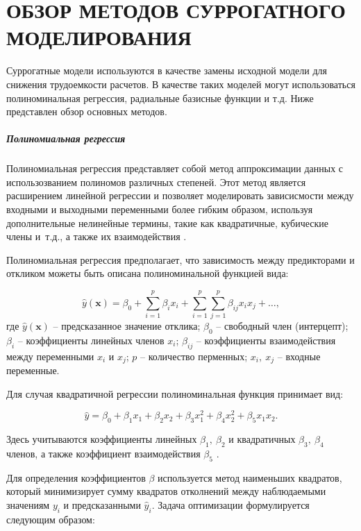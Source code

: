\chapter{ОБЗОР МЕТОДОВ СУРРОГАТНОГО МОДЕЛИРОВАНИЯ}\label{chap:surrogate-modeling}

Суррогатные модели используются в качестве замены исходной модели для снижения трудоемкости
расчетов. В качестве таких моделей могут использоваться полиноминальная регрессия, радиальные
базисные функции и т.д. Ниже представлен обзор основных методов.

\paragraph{Полиномиальная регрессия}

Полиномиальная регрессия представляет собой метод аппроксимации данных
с использозванием полиномов различных степеней. Этот метод является расширением линейной
регрессии и позволяет моделировать зависисмости между входными и выходными переменными более
гибким образом, используя дополнительные нелинейные термины, такие как квадратичные, кубические члены
и~т.д., а также их взаимодействия \cite{fan2018local}.

Полиномиальная регрессия предполагает, что зависимость между предикторами и откликом
можеты быть описана полиноминальной функцией вида:

\begin{equation}
	\hat{y}(\mathbf{x}) = \beta_0 + \sum_{i=1}^{p} \beta_i x_i + \sum_{i=1}^{p} \sum_{j=1}^{p} \beta_{ij} x_i x_j + \ldots,
\end{equation}
где $\hat{y}(\mathbf{x})$ -- предсказанное значение отклика;
$\beta_0$ -- свободный член (интерцепт);
$\beta_i$ -- коэффициенты линейных членов $x_i$;
$\beta_{ij}$ -- коэффициенты взаимодействия между переменными $x_i$ и $x_j$;
$p$ -- количество перменных;
$x_i,~x_j$ -- входные переменные.

Для случая квадратичной регрессии полиноминальная функция принимает вид:

\begin{equation}
	\hat{y} = \beta_0 + \beta_1 x_1 + \beta_2 x_2 + \beta_3 x_1^2
	+ \beta_4 x_2^2 + \beta_5 x_1 x_2.
\end{equation}

Здесь учитываются коэффициенты линейных $\beta_1,~\beta_2$ и квадратичных $\beta_3,~\beta_4$ членов,
а также коэффициент взаимодействия $\beta_5$ \cite{heiberger2009polynomial}.

Для определения коэффициентов $\beta$ используется метод наименьших квадратов,
который минимизирует сумму квадратов отколнений между наблюдаемыми значениям $y_i$
и предсказанными $\hat{y}_i$. Задача оптимизации формулируется следующим образом:

